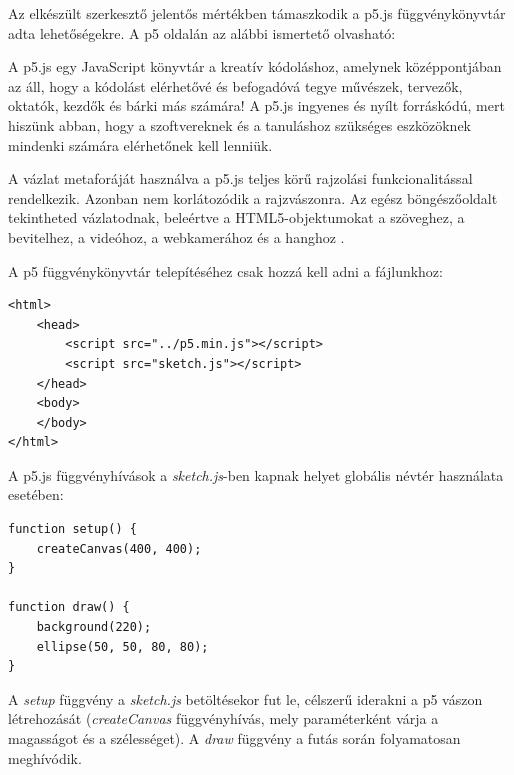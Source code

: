 



Az elkészült szerkesztő jelentős mértékben támaszkodik a p5.js függvénykönyvtár adta lehetőségekre. A p5 oldalán az alábbi ismertető olvasható:


A p5.js egy JavaScript könyvtár a kreatív kódoláshoz, amelynek középpontjában az áll, hogy a kódolást elérhetővé és befogadóvá tegye művészek, tervezők, oktatók, kezdők és bárki más számára! A p5.js ingyenes és nyílt forráskódú, mert hiszünk abban, hogy a szoftvereknek és a tanuláshoz szükséges eszközöknek mindenki számára elérhetőnek kell lenniük.

A vázlat metaforáját használva a p5.js teljes körű rajzolási funkcionalitással rendelkezik. Azonban nem korlátozódik a rajzvászonra. Az egész böngészőoldalt tekintheted vázlatodnak, beleértve a HTML5-objektumokat a szöveghez, a bevitelhez, a videóhoz, a webkamerához és a hanghoz \cite{p5js}.


A p5 függvénykönyvtár telepítéséhez csak hozzá kell adni a fájlunkhoz:

\begin{lstlisting}[style=html]
<html>
	<head>
		<script src="../p5.min.js"></script>
		<script src="sketch.js"></script>
	</head>
	<body>
	</body>
</html>
\end{lstlisting}


A p5.js függvényhívások a \textit{sketch.js}-ben kapnak helyet globális névtér használata esetében:

\begin{lstlisting}[style=es6]
function setup() {
	createCanvas(400, 400);
}

function draw() {
	background(220);
	ellipse(50, 50, 80, 80);
}
\end{lstlisting}

A \textit{setup} függvény a \textit{sketch.js} betöltésekor fut le, célszerű iderakni a p5 vászon létrehozását (\textit{createCanvas} függvényhívás, mely paraméterként várja a magasságot és a szélességet). A \textit{draw} függvény a futás során folyamatosan meghívódik.





